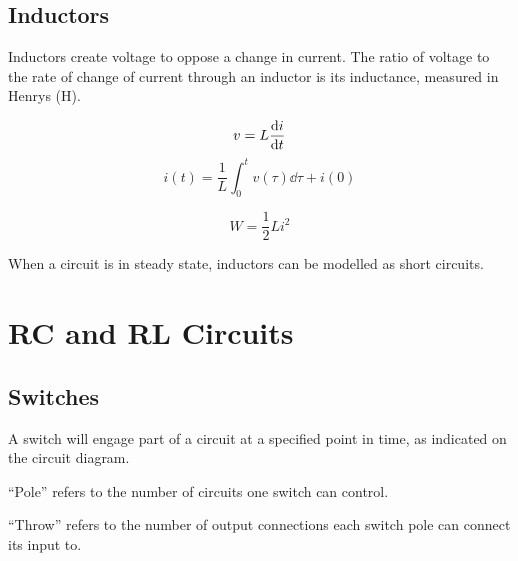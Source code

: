 \documentclass{article}
\begin{document}
\subsection{Inductors}
\begin{definition}
    Inductors create voltage to oppose a change in current. The ratio of voltage 
    to the rate of change of current through an inductor is its inductance, measured in Henrys (\si{\henry}).
\end{definition}
\begin{definition}[VI Relationship]
    \begin{equation*}
        v = L \dv{i}{t}
    \end{equation*}
    \begin{equation*}
        i(t) = \frac{1}{L} \int_0^t v(\tau) \dd{\tau} + i(0)
    \end{equation*}
\end{definition}
\begin{definition}
    \begin{equation*}
        W = \frac{1}{2}Li^2
    \end{equation*}
\end{definition}
\begin{theorem}
    When a circuit is in steady state, inductors can be modelled as short circuits.
\end{theorem}
\newpage
\section{RC and RL Circuits}
\subsection{Switches}
\begin{definition}
    A switch will engage part of a circuit at a specified point in time, as indicated 
    on the circuit diagram.
\end{definition}
\begin{definition}[Poles]
    ``Pole'' refers to the number of circuits one switch can control.
\end{definition}
\begin{definition}[Throw]
    ``Throw'' refers to the number of output connections each switch 
    pole can connect its input to.
\end{definition}
\end{document}
